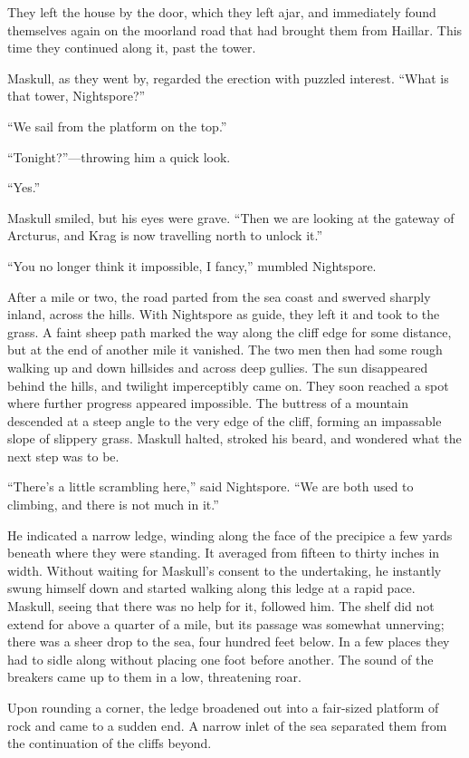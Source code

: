They left the house by the door, which they left ajar, and immediately found themselves again on the moorland road that had brought them from Haillar. This time they continued along it, past the tower.

Maskull, as they went by, regarded the erection with puzzled interest. ``What is that tower, Nightspore?''

``We sail from the platform on the top.''

``Tonight?''—throwing him a quick look.

``Yes.''

Maskull smiled, but his eyes were grave. ``Then we are looking at the gateway of Arcturus, and Krag is now travelling north to unlock it.''

``You no longer think it impossible, I fancy,'' mumbled Nightspore.

After a mile or two, the road parted from the sea coast and swerved sharply inland, across the hills. With Nightspore as guide, they left it and took to the grass. A faint sheep path marked the way along the cliff edge for some distance, but at the end of another mile it vanished. The two men then had some rough walking up and down hillsides and across deep gullies. The sun disappeared behind the hills, and twilight imperceptibly came on. They soon reached a spot where further progress appeared impossible. The buttress of a mountain descended at a steep angle to the very edge of the cliff, forming an impassable slope of slippery grass. Maskull halted, stroked his beard, and wondered what the next step was to be.

``There's a little scrambling here,'' said Nightspore. ``We are both used to climbing, and there is not much in it.''

He indicated a narrow ledge, winding along the face of the precipice a few yards beneath where they were standing. It averaged from fifteen to thirty inches in width. Without waiting for Maskull's consent to the undertaking, he instantly swung himself down and started walking along this ledge at a rapid pace. Maskull, seeing that there was no help for it, followed him. The shelf did not extend for above a quarter of a mile, but its passage was somewhat unnerving; there was a sheer drop to the sea, four hundred feet below. In a few places they had to sidle along without placing one foot before another. The sound of the breakers came up to them in a low, threatening roar.

Upon rounding a corner, the ledge broadened out into a fair-sized platform of rock and came to a sudden end. A narrow inlet of the sea separated them from the continuation of the cliffs beyond.


